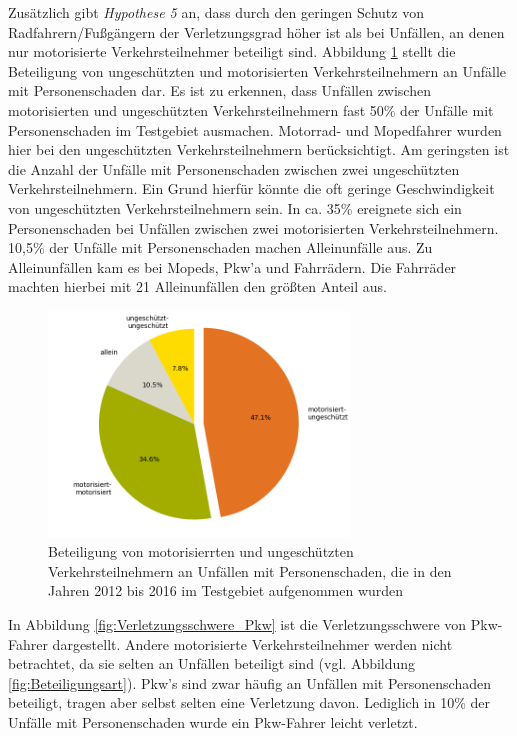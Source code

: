 Zusätzlich gibt \textit{Hypothese 5} an, dass durch den geringen Schutz von Radfahrern/Fußgängern der Verletzungsgrad höher ist als bei Unfällen, an denen nur motorisierte Verkehrsteilnehmer beteiligt sind. Abbildung \ref{fig:Verkehrsbeteiligung_Personenschaden} stellt die Beteiligung von ungeschützten und motorisierten Verkehrsteilnehmern an Unfälle mit Personenschaden dar. Es ist zu erkennen, dass Unfällen zwischen motorisierten und ungeschützten Verkehrsteilnehmern fast 50\% der Unfälle mit Personenschaden im Testgebiet ausmachen. Motorrad- und Mopedfahrer wurden hier bei den ungeschützten Verkehrsteilnehmern berücksichtigt. Am geringsten ist die Anzahl der Unfälle mit Personenschaden zwischen zwei ungeschützten Verkehrsteilnehmern. Ein Grund hierfür könnte die oft geringe Geschwindigkeit von ungeschützten Verkehrsteilnehmern sein. In ca. 35\% ereignete sich ein Personenschaden bei Unfällen zwischen zwei motorisierten Verkehrsteilnehmern. 10,5\% der Unfälle mit Personenschaden machen Alleinunfälle aus. Zu Alleinunfällen kam es bei Mopeds, Pkw'a und Fahrrädern. Die Fahrräder machten hierbei mit 21 Alleinunfällen den größten Anteil aus.

\begin{savenotes}
	\begin{figure}[H]
		\centering
		\includegraphics[width=8cm,height=6cm]{figures/motorisiert_ungeschuetzt}
		\caption[Beteiligung von motorisierrten und ungeschützten Verkehrsteilnehmern an Unfällen mit Personenschaden, die in den Jahren 2012 bis 2016 im Testgebiet aufgenommen wurden]{Beteiligung von motorisierrten und ungeschützten Verkehrsteilnehmern an Unfällen mit Personenschaden, die in den Jahren 2012 bis 2016 im Testgebiet aufgenommen wurden}\label{fig:Verkehrsbeteiligung_Personenschaden}
	\end{figure}
\end{savenotes}

In Abbildung \ref{fig:Verletzungsschwere_Pkw} ist die Verletzungsschwere von Pkw-Fahrer dargestellt. Andere motorisierte Verkehrsteilnehmer werden nicht betrachtet, da sie selten an Unfällen beteiligt sind (vgl. Abbildung \ref{fig:Beteiligungsart}). Pkw's sind zwar häufig an Unfällen mit Personenschaden beteiligt, tragen aber selbst selten eine Verletzung davon. Lediglich in 10\% der Unfälle mit Personenschaden wurde ein Pkw-Fahrer leicht verletzt.

